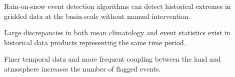 \documentclass[draft]{agujournal2019}
\begin{document}


\begin{keypoints}
\item Rain-on-snow event detection algorithms can detect historical extremes in gridded data at the basin-scale without manual intervention.
\item Large discrepancies in both mean climatology and event statistics exist in historical data products representing the same time period.
\item Finer temporal data and more frequent coupling between the land and atmosphere increases the number of flagged events.
\end{keypoints}

%
%

%
%

 
 	
\end{document}
